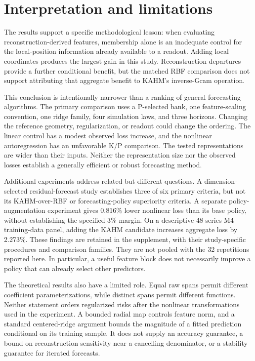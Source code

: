 
\section{Interpretation and limitations}\label{sec:discussion}
The results support a specific methodological lesson: when evaluating reconstruction-derived features, membership alone is an inadequate control for the local-position information already available to a readout. Adding local coordinates produces the largest gain in this study. Reconstruction departures provide a further conditional benefit, but the matched RBF comparison does not support attributing that aggregate benefit to KAHM's inverse-Gram operation.

This conclusion is intentionally narrower than a ranking of general forecasting algorithms. The primary comparison uses a P-selected bank, one feature-scaling convention, one ridge family, four simulation laws, and three horizons. Changing the reference geometry, regularization, or readout could change the ordering. The linear control has a modest observed loss increase, and the nonlinear autoregression has an unfavorable K/P comparison. The tested representations are wider than their inputs. Neither the representation size nor the observed losses establish a generally efficient or robust forecasting method.

Additional experiments address related but different questions. A dimension-selected residual-forecast study establishes three of six primary criteria, but not its KAHM-over-RBF or forecasting-policy superiority criteria. A separate policy-augmentation experiment gives 0.816\% lower nonlinear loss than its base policy, without establishing the specified 3\% margin. On a descriptive 48-series M4 training-data panel, adding the KAHM candidate increases aggregate loss by 2.273\%. These findings are retained in the supplement, with their study-specific procedures and comparison families. They are not pooled with the 32 repetitions reported here. In particular, a useful feature block does not necessarily improve a policy that can already select other predictors.

The theoretical results also have a limited role. Equal raw spans permit different coefficient parameterizations, while distinct spans permit different functions. Neither statement orders regularized risks after the nonlinear transformations used in the experiment. A bounded radial map controls feature norm, and a standard centered-ridge argument bounds the magnitude of a fitted prediction conditional on its training sample. It does not supply an accuracy guarantee, a bound on reconstruction sensitivity near a cancelling denominator, or a stability guarantee for iterated forecasts.

